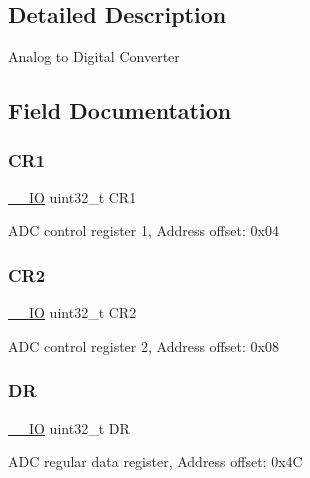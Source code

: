\subsection{Detailed Description}
Analog to Digital Converter ~\newline
 

\subsection{Field Documentation}
\mbox{\label{struct_a_d_c___type_def_ab0ec7102960640751d44e92ddac994f0}} 
\subsubsection{\texorpdfstring{C\+R1}{CR1}}
{\footnotesize\ttfamily \mbox{\hyperlink{core__sc300_8h_aec43007d9998a0a0e01faede4133d6be}{\+\_\+\+\_\+\+IO}} uint32\+\_\+t C\+R1}

A\+DC control register 1, Address offset\+: 0x04 \mbox{\label{struct_a_d_c___type_def_afdfa307571967afb1d97943e982b6586}} 
\subsubsection{\texorpdfstring{C\+R2}{CR2}}
{\footnotesize\ttfamily \mbox{\hyperlink{core__sc300_8h_aec43007d9998a0a0e01faede4133d6be}{\+\_\+\+\_\+\+IO}} uint32\+\_\+t C\+R2}

A\+DC control register 2, Address offset\+: 0x08 \mbox{\label{struct_a_d_c___type_def_a3df0d8dfcd1ec958659ffe21eb64fa94}} 
\subsubsection{\texorpdfstring{DR}{DR}}
{\footnotesize\ttfamily \mbox{\hyperlink{core__sc300_8h_aec43007d9998a0a0e01faede4133d6be}{\+\_\+\+\_\+\+IO}} uint32\+\_\+t DR}

A\+DC regular data register, Address offset\+: 0x4C \mbox{\label{struct_a_d_c___type_def_a24c3512abcc90ef75cf3e9145e5dbe9b}} 
